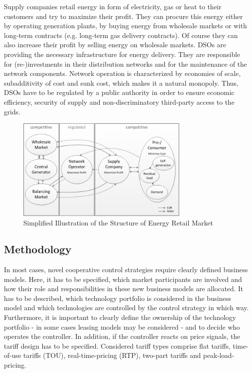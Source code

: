 \documentclass[conference]{IEEEtran}
\begin{document}
Supply companies retail energy in form of electricity, gas or heat to
their customers and try to maximize their profit. They can procure
this energy either by operating generation plants, by buying energy
from wholesale markets or with long-term contracts (e.g. long-term gas
delivery contracts). Of course they can also increase their profit by
selling energy on wholesale markets. 
DSOs are providing the necessary infrastructure for energy
delivery. They are responsible for (re-)investments in their
distribution networks and for the maintenance of the network
components. Network operation is characterized by economies of scale,
subadditivity of cost and sunk cost, which makes it a natural
monopoly. Thus, DSOs have to be regulated by a public authority in
order to ensure economic efficiency, security of supply and
non-discriminatory third-party access to the grids. 

\begin{figure}[th]
  \centering
  \includegraphics[width=85mm]{figures/market_structure.png}
  \caption{Simplified Illustration of the Structure of Energy Retail
    Market}
  \label{fig:market_structure}
\end{figure}

\subsection{Methodology}
\label{sec:econ-2}
In most cases, novel cooperative control strategies require clearly
defined business models. Here, it has to be specified, which market
participants are involved and how their role and responsibilities in
these new business models are allocated. It has to be described, which
technology portfolio is considered in the business model and which
technologies are controlled by the control strategy in which
way. Furthermore, it is important to clearly define the ownership of
the technology portfolio - in some cases leasing models may be
considered - and to decide who operates the controller. In addition,
if the controller reacts on price signals, the tariff design has to be
specified. Considered tariff types comprise flat tariffs, time-of-use
tariffs (TOU), real-time-pricing (RTP), two-part tariffs and
peak-load-pricing. 
\end{document}
